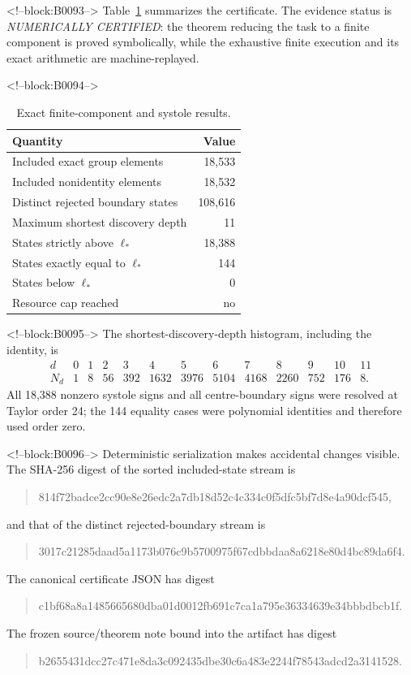 \documentclass[11pt,a4paper]{article}
\theoremstyle{definition}
\newcommand{\length}{\ell}
\begin{document}
<!--block:B0093-->
Table~\ref{tab:results} summarizes the certificate.  The evidence status is
\emph{NUMERICALLY CERTIFIED}: the theorem reducing the task to a finite
component is proved symbolically, while the exhaustive finite execution and
its exact arithmetic are machine-replayed.

<!--block:B0094-->
\begin{table}[htbp]
\centering
\caption{Exact finite-component and systole results.}
\label{tab:results}
\begin{tabular}{@{}lr@{}}
\toprule
Quantity & Value\\
\midrule
Included exact group elements & 18,533\\
Included nonidentity elements & 18,532\\
Distinct rejected boundary states & 108,616\\
Maximum shortest discovery depth & 11\\
States strictly above \(\length_*\) & 18,388\\
States exactly equal to \(\length_*\) & 144\\
States below \(\length_*\) & 0\\
Resource cap reached & no\\
\bottomrule
\end{tabular}
\end{table}

<!--block:B0095-->
The shortest-discovery-depth histogram, including the identity, is
\[
\begin{array}{c|rrrrrrrrrrrr}
d&0&1&2&3&4&5&6&7&8&9&10&11\\\hline
N_d&1&8&56&392&1632&3976&5104&4168&2260&752&176&8.
\end{array}
\]
All 18,388 nonzero systole signs and all centre-boundary signs were resolved
at Taylor order 24; the 144 equality cases were polynomial identities and
therefore used order zero.

<!--block:B0096-->
Deterministic serialization makes accidental changes visible.  The SHA-256
digest of the sorted included-state stream is
\begin{quote}\ttfamily\small
814f72badce2cc90e8e26edc2a7db18d52c4c334c0f5dfc5bf7d8e4a90dcf545,
\end{quote}
and that of the distinct rejected-boundary stream is
\begin{quote}\ttfamily\small
3017c21285daad5a1173b076c9b5700975f67cdbbdaa8a6218e80d4bc89da6f4.
\end{quote}
The canonical certificate JSON has digest
\begin{quote}\ttfamily\small
c1bf68a8a1485665680dba01d0012fb691c7ca1a795e36334639e34bbbdbcb1f.
\end{quote}
The frozen source/theorem note bound into the artifact has digest
\begin{quote}\ttfamily\small
b2655431dcc27c471e8da3c092435dbe30c6a483e2244f78543adcd2a3141528.
\end{quote}
\end{document}
